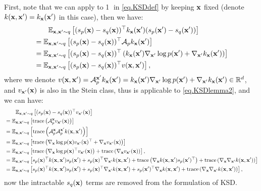 \documentclass{article}
\begin{document}
First, note that we can apply  to \textcircled{1} in \eqref{eq.KSDdef} by keeping ${\mathbf{x}}$ fixed (denote $k({\mathbf{x}}, {\mathbf{x}}') = k_{\mathbf{x}}({\mathbf{x}}')$ in this case), then we have:
\begin{align}
    &\qquad \mathbb{E}_{{\mathbf{x}}, {\mathbf{x}}' \sim q}\left[ (s_p({\mathbf{x}}) - s_q({\mathbf{x}}))^\top k_{{\mathbf{x}}}({\mathbf{x}}') (s_p({\mathbf{x}}') - s_q({\mathbf{x}}')) \right] \\
    &= \mathbb{E}_{{\mathbf{x}}, {\mathbf{x}}' \sim q} \left[ (s_p({\mathbf{x}}) - s_q({\mathbf{x}}))^\top \mathcal{A}_{p} k_{{\mathbf{x}}}({\mathbf{x}}') \right] \\
    &= \mathbb{E}_{{\mathbf{x}}, {\mathbf{x}}' \sim q} \left[ (s_p({\mathbf{x}}) - s_q({\mathbf{x}}))^\top \left( k_{\mathbf{x}}({\mathbf{x}}')\nabla_{{\mathbf{x}}'}\log p({\mathbf{x}}') + \nabla_{{\mathbf{x}}'}k_{{\mathbf{x}}}({\mathbf{x}}') \right)   \right] \\
    &= \mathbb{E}_{{\mathbf{x}}, {\mathbf{x}}' \sim q} \left[ (s_p({\mathbf{x}}) - s_q({\mathbf{x}}))^\top v({\mathbf{x}}, {\mathbf{x}}') \right], \label{eq.KSDlemma2}
\end{align}
where we denote $v({\mathbf{x}}, {\mathbf{x}}') = \mathcal{A}_{p}^{{\mathbf{x}}'}k_{{\mathbf{x}}}({\mathbf{x}}') = k_{\mathbf{x}}({\mathbf{x}}')\nabla_{{\mathbf{x}}'}\log p({\mathbf{x}}') + \nabla_{{\mathbf{x}}'}k_{{\mathbf{x}}}({\mathbf{x}}') \in \mathbb{R}^d$, and $v_{{\mathbf{x}}'}({\mathbf{x}})$ is also in the Stein class, thus  is applicable to \eqref{eq.KSDlemma2}, and we can have:
\begin{align}
    &\qquad \mathbb{E}_{{\mathbf{x}}, {\mathbf{x}}' \sim q} \left[ (s_p({\mathbf{x}}) - s_q({\mathbf{x}}))^\top v_{{\mathbf{x}}'}({\mathbf{x}}) \right] \\
    &= \mathbb{E}_{{\mathbf{x}}, {\mathbf{x}}' \sim q} \left[ \mathrm{trace}\left( \mathcal{A}_p^{\mathbf{x}} v_{{\mathbf{x}}'}({\mathbf{x}}) \right) \right] \\
    &= \mathbb{E}_{{\mathbf{x}}, {\mathbf{x}}' \sim q} \left[ \mathrm{trace} \left( \mathcal{A}_p^{{\mathbf{x}}} \mathcal{A}_p^{{\mathbf{x}}'} k({\mathbf{x}}, {\mathbf{x}}') \right) \right] \\
    &= \mathbb{E}_{{\mathbf{x}}, {\mathbf{x}}' \sim q} \left[ \mathrm{trace} \left( \nabla_{{\mathbf{x}}} \log p({\mathbf{x}}) v_{{\mathbf{x}}'}({\mathbf{x}})^\top + \nabla_{\mathbf{x}} v_{{\mathbf{x}}'}({\mathbf{x}}) \right) \right] \\
    &= \mathbb{E}_{{\mathbf{x}}, {\mathbf{x}}' \sim q} \left[ \mathrm{trace} \left( \nabla_{{\mathbf{x}}} \log p({\mathbf{x}})^\top v_{{\mathbf{x}}'}({\mathbf{x}}) \right) + \mathrm{trace}\left( \nabla_{\mathbf{x}} v_{{\mathbf{x}}'}({\mathbf{x}}) \right)\right], \\
    &= \mathbb{E}_{{\mathbf{x}}, {\mathbf{x}}' \sim q} \left[ s_p({\mathbf{x}})^\top k({\mathbf{x}}, {\mathbf{x}}') s_p({\mathbf{x}}') + s_p({\mathbf{x}})^\top \nabla_{{\mathbf{x}}'}k({\mathbf{x}}, {\mathbf{x}}') + \mathrm{trace}\left( \nabla_{\mathbf{x}} k({\mathbf{x}}, {\mathbf{x}}')s_p({\mathbf{x}}')^\top \right) + \mathrm{trace}\left( \nabla_{\mathbf{x}} \nabla_{{\mathbf{x}}'}k({\mathbf{x}}, {\mathbf{x}}') \right)\right] \\
    &= \mathbb{E}_{{\mathbf{x}}, {\mathbf{x}}' \sim q} \left[ s_p({\mathbf{x}})^\top k({\mathbf{x}}, {\mathbf{x}}') s_p({\mathbf{x}}') + s_p({\mathbf{x}})^\top \nabla_{{\mathbf{x}}'}k({\mathbf{x}}, {\mathbf{x}}') +  s_p({\mathbf{x}}')^\top \nabla_{\mathbf{x}} k({\mathbf{x}}, {\mathbf{x}}') + \mathrm{trace}\left( \nabla_{\mathbf{x}} \nabla_{{\mathbf{x}}'}k({\mathbf{x}}, {\mathbf{x}}') \right) \right],
\end{align}
now the intractable $s_q({\mathbf{x}})$ terms are removed from the formulation of KSD.
\end{document}
